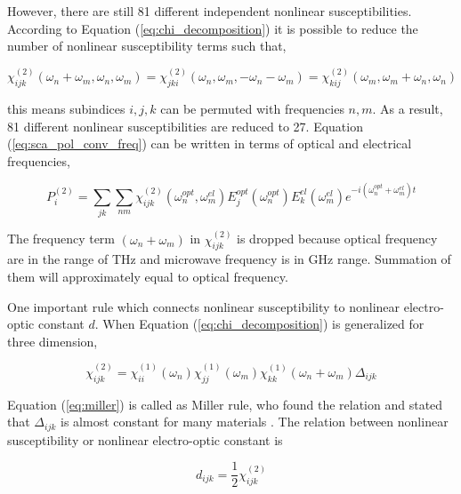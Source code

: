 \documentclass[thesis]{deutez}
\begin{document}
    However, there are still 81 different independent nonlinear susceptibilities.  According to Equation (\ref{eq:chi_decomposition}) it is possible to reduce the number of nonlinear susceptibility terms such that,
    
    \begin{equation}
        \chi^{(2)}_{ijk}(\omega_n+\omega_m,\omega_n,\omega_m) = \chi^{(2)}_{jki}(\omega_n,\omega_m,-\omega_n-\omega_m) = \chi^{(2)}_{kij}(\omega_m,\omega_m+\omega_n,\omega_n)
        \label{eq:index_reducation}
    \end{equation}

    this means subindices $i,j,k$ can be permuted with frequencies $n,m$. As a result, 81 different nonlinear susceptibilities are reduced to 27. Equation (\ref{eq:sca_pol_conv_freq}) can be written in terms of optical and electrical frequencies,

    \begin{equation}
        P_i^{(2)} = \sum_{jk}\sum_{nm} \chi^{(2)}_{ijk}(\omega^{opt}_n, \omega^{el}_m) E^{opt}_j(\omega^{opt}_n)E^{el}_k(\omega^{el}_m)e^{-i(\omega^{opt}_n+\omega^{el}_m)t}
        \label{eq:sca_pol_conv_freq_opt_el}
    \end{equation}

    The frequency term $(\omega_n+\omega_m)$ in $\chi^{(2)}_{ijk}$ is dropped because optical frequency are in the range of THz and microwave frequency is in GHz range. Summation of them will approximately equal to optical frequency. 
    
    One important rule which connects nonlinear susceptibility to nonlinear electro-optic constant $d$. When Equation (\ref{eq:chi_decomposition}) is generalized for three dimension,

    \begin{equation}
        \chi^{(2)}_{ijk} = \chi^{(1)}_{ii} (\omega_n) \chi^{(1)}_{jj} (\omega_m) \chi^{(1)}_{kk} (\omega_n+\omega_m) \Delta_{ijk}
        \label{eq:miller}
    \end{equation}

    Equation (\ref{eq:miller}) is called as Miller rule, who found the relation and stated that $\Delta_{ijk}$ is almost constant for many materials \cite{11}. The relation between nonlinear susceptibility or nonlinear electro-optic constant is 

    \begin{equation}
        d_{ijk} = \frac{1}{2}\chi^{(2)}_{ijk}
        \label{eq:sus-const}
    \end{equation}
\end{document}
